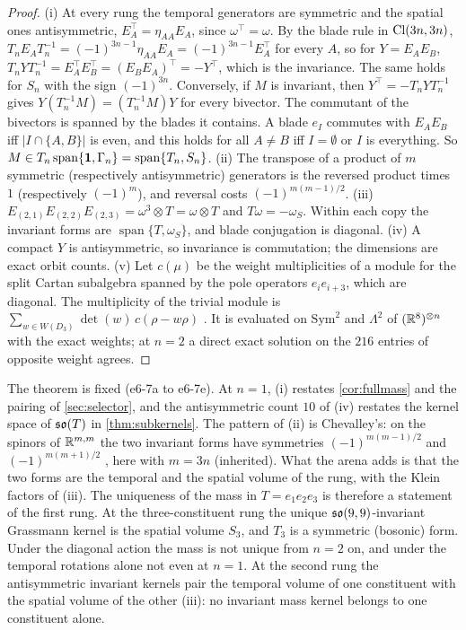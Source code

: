 \begin{proof}
(i) At every rung the temporal generators are symmetric and the spatial ones antisymmetric, $E_A^{\!\top}=\eta_{AA}E_A$, since $\omega^{\!\top}=\omega$. By the
blade rule in $\mathrm{Cl}(3n,3n)$, $T_nE_AT_n^{-1}=(-1)^{3n-1}\eta_{AA}E_A=(-1)^{3n-1}E_A^{\!\top}$ for every $A$, so for $Y=E_AE_B$,
$T_nYT_n^{-1}=E_A^{\!\top}E_B^{\!\top}=(E_BE_A)^{\!\top}=-Y^{\!\top}$, which is the invariance. The same holds for $S_n$ with the sign $(-1)^{3n}$. Conversely, if $M$ is
invariant, then $Y^{\!\top}=-T_nYT_n^{-1}$ gives $Y(T_n^{-1}M)=(T_n^{-1}M)Y$ for every bivector. The commutant of the bivectors is spanned by the blades it
contains. A blade $e_I$ commutes with $E_AE_B$ iff $|I\cap\{A,B\}|$ is even, and this holds for all $A\neq B$ iff $I=\emptyset$ or $I$ is everything. So
$M\in T_n\operatorname{span}\{\mathbf 1,\Gamma_n\}=\operatorname{span}\{T_n,S_n\}$. (ii) The transpose of a product of $m$ symmetric (respectively antisymmetric)
generators is the reversed product times $1$ (respectively $(-1)^m$), and reversal costs $(-1)^{m(m-1)/2}$. (iii) $E_{(2,1)}E_{(2,2)}E_{(2,3)}=\omega^3\otimes T=\omega\otimes T$
and $T\omega=-\omega_S$. Within each copy the invariant forms are $\operatorname{span}\{T,\omega_S\}$, and blade conjugation is diagonal. (iv) A compact $Y$
is antisymmetric, so invariance is commutation; the dimensions are exact orbit counts. (v) Let $c(\mu)$ be the weight multiplicities of a module for
the split Cartan subalgebra spanned by the pole operators $e_ie_{i+3}$, which are diagonal. The multiplicity of the trivial module is
$\sum_{w\in W(D_3)}\det(w)\,c(\rho-w\rho)$ \cite{Humphreys72}. It is evaluated on $\mathrm{Sym}^2$ and $\Lambda^2$ of $(\mathbb{R}^8)^{\otimes n}$ with the exact weights; at $n=2$ a
direct exact solution on the $216$ entries of opposite weight agrees.
\end{proof}

The theorem is fixed (e6-7a to e6-7e). At $n=1$, (i) restates \cref{cor:fullmass} and the pairing of \cref{sec:selector}, and the
antisymmetric count $10$ of (iv) restates the kernel space of $\mathfrak{so}(T)$ in \cref{thm:subkernels}. The pattern of
(ii) is Chevalley's: on the spinors of $\mathbb{R}^{m,m}$ the two invariant forms have symmetries $(-1)^{m(m-1)/2}$ and $(-1)^{m(m+1)/2}$
\cite{Chevalley54,LawsonMichelsohn89}, here with $m=3n$ (inherited). What the arena adds is that the two forms are the temporal and the spatial volume
of the rung, with the Klein factors of (iii). The uniqueness of the mass in $T=e_1e_2e_3$ is therefore a statement of the first rung. At the three-constituent rung the unique $\mathfrak{so}(9,9)$-invariant Grassmann kernel is the spatial volume $S_3$, and $T_3$ is a symmetric (bosonic) form. Under
the diagonal action the mass is not unique from $n=2$ on, and under the temporal rotations alone not even at $n=1$. At the second rung the
antisymmetric invariant kernels pair the temporal volume of one constituent with the spatial volume of the other (iii): no invariant mass kernel
belongs to one constituent alone.

